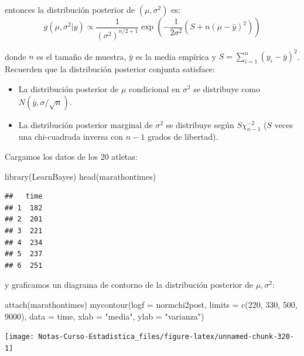 \documentclass[
  12pt,
]{book}
\newenvironment{Shaded}{\begin{snugshade}}{\end{snugshade}}
\newcommand{\AttributeTok}[1]{\textcolor[rgb]{0.77,0.63,0.00}{#1}}
\newcommand{\DecValTok}[1]{\textcolor[rgb]{0.00,0.00,0.81}{#1}}
\newcommand{\FunctionTok}[1]{\textcolor[rgb]{0.00,0.00,0.00}{#1}}
\newcommand{\NormalTok}[1]{#1}
\newcommand{\StringTok}[1]{\textcolor[rgb]{0.31,0.60,0.02}{#1}}
\providecommand{\tightlist}{%
  \setlength{\itemsep}{0pt}\setlength{\parskip}{0pt}}
\theoremstyle{definition}
\theoremstyle{definition}
\theoremstyle{definition}
\theoremstyle{definition}
\theoremstyle{remark}
\begin{document}
entonces la distribución posterior de \((\mu,\sigma^2)\) es:
\[g(\mu,\sigma^2|y)\propto \frac{1}{(\sigma^2)^{n/2+1}}\exp{\left(-\frac{1}{2\sigma^2}\left(S+n(\mu-\bar y)^2\right)\right)}\]

donde \(n\) es el tamaño de muestra, \(\bar y\) es la media empírica y \(S=\sum_{i=1}^n(y_i-\bar y)^2\). Recuerden que la distribución posterior conjunta satisface:

\begin{itemize}
\tightlist
\item
  La distribución posterior de \(\mu\) condicional en \(\sigma^2\) se distribuye como \(N(\bar y,\sigma/\sqrt{n})\).
\item
  La distribución posterior marginal de \(\sigma^2\) se distribuye según \(S\chi_{n-1}^{-2}\) (\(S\) veces una chi-cuadrada inversa con \(n-1\) grados de libertad).
\end{itemize}

Cargamos los datos de los 20 atletas:

\begin{Shaded}
\begin{Highlighting}[]
\FunctionTok{library}\NormalTok{(LearnBayes)}
\FunctionTok{head}\NormalTok{(marathontimes)}
\end{Highlighting}
\end{Shaded}

\begin{verbatim}
##   time
## 1  182
## 2  201
## 3  221
## 4  234
## 5  237
## 6  251
\end{verbatim}

y graficamos un diagrama de contorno de la distribución posterior de \(\mu,\sigma^2\):

\begin{Shaded}
\begin{Highlighting}[]
\FunctionTok{attach}\NormalTok{(marathontimes)}
\FunctionTok{mycontour}\NormalTok{(}\AttributeTok{logf =}\NormalTok{ normchi2post, }\AttributeTok{limits =} \FunctionTok{c}\NormalTok{(}\DecValTok{220}\NormalTok{, }\DecValTok{330}\NormalTok{,}
    \DecValTok{500}\NormalTok{, }\DecValTok{9000}\NormalTok{), }\AttributeTok{data =}\NormalTok{ time, }\AttributeTok{xlab =} \StringTok{"media"}\NormalTok{, }\AttributeTok{ylab =} \StringTok{"varianza"}\NormalTok{)}
\end{Highlighting}
\end{Shaded}

\begin{center}\texttt{[image: Notas-Curso-Estadistica\_files/figure-latex/unnamed-chunk-320-1]} \end{center}
\end{document}
